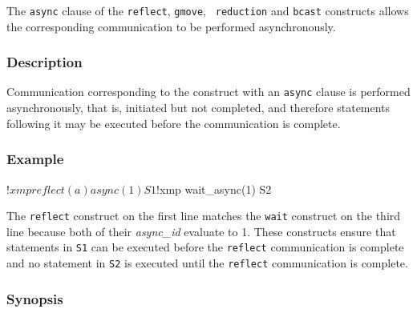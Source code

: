 The {\tt async} clause of the {\tt reflect}, {\tt gmove}, {\tt
reduction} and {\tt bcast} constructs allows the corresponding
communication to be performed asynchronously.

\subsubsection*{Description}

Communication corresponding to the construct with an {\tt async} clause
is performed asynchronously, that is, initiated but not completed,
and therefore statements following it may be executed before the
communication is complete.

%

\subsubsection*{Example}

\begin{XFexample}
!$xmp reflect (a) async(1)
      S1
!$xmp wait_async(1)
      S2
\end{XFexample}

The {\tt reflect} construct on the first line matches the {\tt wait}
construct on the third line because both of their {\it async\_id}
evaluate to 1.
%
These constructs ensure that statements in {\tt S1} can be executed
before the {\tt reflect} communication is complete and no statement in
{\tt S2} is executed until the {\tt reflect} communication is
complete.



\subsubsection*{Synopsis}

